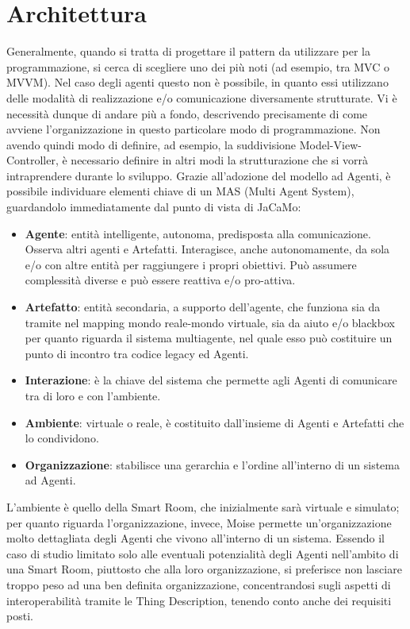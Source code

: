 \documentclass[12pt,a4paper,openright,oneside]{report}
\begin{document}
\section{Architettura}
\label{sec:Architettura}
Generalmente, quando si tratta di progettare il pattern da utilizzare per la programmazione, si cerca di scegliere uno dei più noti (ad esempio, tra MVC o MVVM). Nel caso degli agenti questo non è possibile, in quanto essi utilizzano delle modalità di realizzazione e/o comunicazione diversamente strutturate. Vi è necessità dunque di andare più a fondo, descrivendo precisamente di come avviene l'organizzazione in questo particolare modo di programmazione. Non avendo quindi modo di definire, ad esempio, la suddivisione Model-View-Controller, è necessario definire in altri modi la strutturazione che si vorrà intraprendere durante lo sviluppo. Grazie all'adozione del modello ad Agenti, è possibile individuare elementi chiave di un MAS (Multi Agent System), guardandolo immediatamente dal punto di vista di JaCaMo:

\begin{itemize}
	\item \textbf{Agente}: entità intelligente, autonoma, predisposta alla comunicazione. Osserva altri agenti e Artefatti. Interagisce, anche autonomamente, da sola e/o con altre entità per raggiungere i propri obiettivi. Può assumere complessità diverse e può essere reattiva e/o pro-attiva.
	
	\item \textbf{Artefatto}: entità secondaria, a supporto dell'agente, che funziona sia da tramite nel mapping mondo reale-mondo virtuale, sia da aiuto e/o blackbox per quanto riguarda il sistema multiagente, nel quale esso può costituire un punto di incontro tra codice legacy ed Agenti.
	
	\item \textbf{Interazione}: è la chiave del sistema che permette agli Agenti di comunicare tra di loro e con l'ambiente.
	
	\item \textbf{Ambiente}: virtuale o reale, è costituito dall'insieme di Agenti e Artefatti che lo condividono.
	
	\item \textbf{Organizzazione}: stabilisce una gerarchia e l'ordine all'interno di un sistema ad Agenti.
\end{itemize}

L'ambiente è quello della Smart Room, che inizialmente sarà virtuale e simulato; per quanto riguarda l'organizzazione, invece, Moise permette un'organizzazione molto dettagliata degli Agenti che vivono all'interno di un sistema. Essendo il caso di studio limitato solo alle eventuali potenzialità degli Agenti nell'ambito di una Smart Room, piuttosto che alla loro organizzazione, si preferisce non lasciare troppo peso ad una ben definita organizzazione, concentrandosi sugli aspetti di interoperabilità tramite le Thing Description, tenendo conto anche dei requisiti posti.\\
\end{document}

